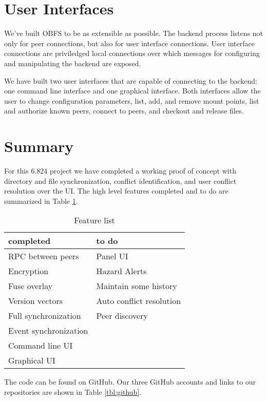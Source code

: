 \documentclass[10pt,twocolumn]{article}
\begin{document}
\section{User Interfaces}
We've built OBFS to be as extensible as possible. The backend process listens
not only for peer connections, but also for user interface connections. User
interface connections are priviledged local connections over which messages
for configuring and manipulating the backend are exposed. 

We have built two user interfaces that are capable of connecting to the 
backend: one command line interface and one graphical interface. Both 
interfaces allow the user to change configuration parameters, list, add, and
remove mount points, list and authorize known peers, connect to peers, 
and checkout and release files. 


\section{Summary}

For this 6.824 project we have completed a working proof of concept with 
directory and file synchronization, conflict identification, and user
conflict resolution over the UI. The high level features completed and to do
are summarized in Table \ref{tbl:FeatureList}.


\begin{table}
    \centering
    \begin{tabular}{l|l}
        \textbf{completed}      &   \textbf{to do}  \\ \hline
        RPC between peers       &   Panel UI        \\
        Encryption              &   Hazard Alerts   \\
        Fuse overlay            &   Maintain some history   \\
        Version vectors         &   Auto conflict resolution   \\
        Full synchronization    &   Peer discovery          \\
        Event synchronization   &\\
        Command line UI         &\\
        Graphical UI            
    \end{tabular}
    \caption{Feature list}
    \label{tbl:FeatureList}
\end{table}

The code can be found on GitHub. Our three GitHub accounts and links to 
our repositories are shown in Table \ref{tbl:github}. 
\end{document}
